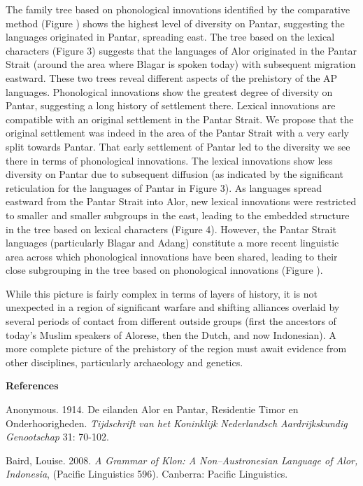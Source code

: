 The family tree based on phonological innovations identified by the comparative method (Figure ) shows the highest level of diversity on Pantar, suggesting the languages originated in Pantar, spreading east. The tree based on the lexical characters (Figure 3) suggests that the languages of Alor originated in the Pantar Strait (around the area where Blagar is spoken today) with subsequent migration eastward. These two trees reveal different aspects of the prehistory of the AP languages. Phonological innovations show the greatest degree of diversity on Pantar, suggesting a long history of settlement there. Lexical innovations are compatible with an original settlement in the Pantar Strait. We propose that the original settlement was indeed in the area of the Pantar Strait with a very early split towards Pantar. That early settlement of Pantar led to the diversity we see there in terms of phonological innovations. The lexical innovations show less diversity on Pantar due to subsequent diffusion (as indicated by 
the significant reticulation for the languages of Pantar in Figure 3). As languages spread eastward from the Pantar Strait into Alor, new lexical innovations were restricted to smaller and smaller subgroups in the east, leading to the embedded structure in the tree based on lexical characters (Figure 4). However, the Pantar Strait languages (particularly Blagar and Adang) constitute a more recent linguistic area across which phonological innovations have been shared, leading to their close subgrouping in the tree based on phonological innovations (Figure ).  

While this picture is fairly complex in terms of layers of history, it is not unexpected in a region of significant warfare and shifting alliances overlaid by several periods of contact from different outside groups (first the ancestors of today{\textquoteright}s Muslim speakers of Alorese, then the Dutch, and now Indonesian). A more complete picture of the prehistory of the region must await evidence from other disciplines, particularly archaeology and genetics. 

{\bfseries
References}

Anonymous. 1914. De eilanden Alor en Pantar, Residentie Timor en Onderhoorigheden. \textit{Tijdschrift van het Koninklijk Nederlandsch Aardrijkskundig Genootschap} 31: 70-102.

Baird, Louise. 2008. \textit{A Grammar of Klon: A Non--Austronesian Language of Alor, Indonesia}, (Pacific Linguistics 596). Canberra: Pacific Linguistics.

